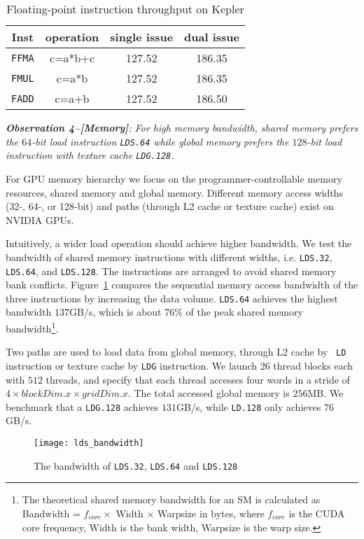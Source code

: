 \begin{table}[htbp]
\caption{\small Floating-point instruction throughput on Kepler}
\centering
\scalebox{0.8} {
\begin{tabular}{|c|c|c|c|}
\hline
Inst &operation&single issue&dual issue\\
\hline
{\tt FFMA} &c=a*b+c&127.52&186.35 \\
\hline
{\tt FMUL} &c=a*b&127.52&186.35 \\
\hline
{\tt FADD} &c=a+b&127.52&186.50\\
\hline
\end{tabular}
}
\label{tab:ffma}
\end{table}

{\em {\bf Observation 4--[Memory]}: For high memory bandwidth, shared memory prefers the $64$-bit load
instruction {\tt LDS.64} while global memory prefers the $128$-bit load instruction with texture cache {\tt LDG.128}.}

For GPU memory hierarchy we focus on the programmer-controllable memory resources, shared memory and global memory.
Different memory access widths (32-, 64-, or 128-bit) and paths (through L2 cache or texture cache) exist on NVIDIA GPUs.

Intuitively, a wider load operation should achieve higher bandwidth.
We test the bandwidth of shared memory instructions with different widths, i.e. {\tt LDS.32}, {\tt LDS.64}, and {\tt LDS.128}.
The instructions are arranged to avoid shared memory bank conflicts.
Figure~\ref{fig:lds_bw} compares the sequential memory access bandwidth of the three instructions by increasing the data volume.
{\tt LDS.64} achieves the highest bandwidth $137$GB/s, which is about $76\%$ of the peak shared memory bandwidth\footnote{The
theoretical shared memory bandwidth for an SM is calculated as Bandwidth = $f_{core} \times$ Width $\times$ Warpsize in bytes, where $f_{core}$ is the CUDA core frequency, Width is the bank width, Warpsize is the warp size.}.

Two paths are used to load data from global memory, through L2 cache by {\tt
LD} instruction or texture cache by {\tt LDG} instruction.
We launch $26$ thread blocks each with $512$ threads, and specify that each thread accesses four words in a stride of $4 \times blockDim.x \times gridDim.x$.
The total accessed global memory is $256$MB.
We benchmark that a {\tt LDG.128} achieves $131$GB/s, while {\tt LD.128} only achieves $76$GB/s.

\begin{figure}[htbp]
\begin{center}
\texttt{[image: lds\_bandwidth]}
    \caption{\small The bandwidth of {\tt LDS.32}, {\tt LDS.64} and {\tt LDS.128}}
\label{fig:lds_bw}
\end{center}
\end{figure}
